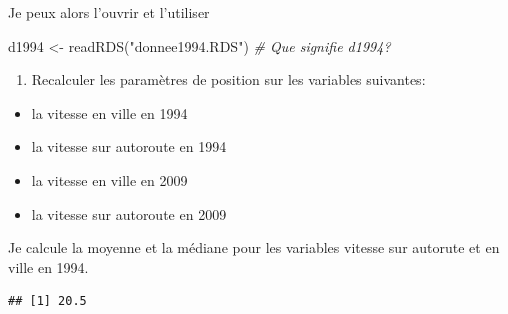 \documentclass[
]{article}
\newenvironment{Shaded}{\begin{snugshade}}{\end{snugshade}}
\newcommand{\CommentTok}[1]{\textcolor[rgb]{0.56,0.35,0.01}{\textit{#1}}}
\newcommand{\FunctionTok}[1]{\textcolor[rgb]{0.00,0.00,0.00}{#1}}
\newcommand{\NormalTok}[1]{#1}
\newcommand{\OtherTok}[1]{\textcolor[rgb]{0.56,0.35,0.01}{#1}}
\newcommand{\SpecialCharTok}[1]{\textcolor[rgb]{0.00,0.00,0.00}{#1}}
\newcommand{\StringTok}[1]{\textcolor[rgb]{0.31,0.60,0.02}{#1}}
\providecommand{\tightlist}{%
  \setlength{\itemsep}{0pt}\setlength{\parskip}{0pt}}
\begin{document}
Je peux alors l'ouvrir et l'utiliser

\begin{Shaded}
\begin{Highlighting}[]
\NormalTok{d1994 }\OtherTok{\textless{}{-}} \FunctionTok{readRDS}\NormalTok{(}\StringTok{"donnee1994.RDS"}\NormalTok{)  }\CommentTok{\# Que signifie d1994?}
\end{Highlighting}
\end{Shaded}

\begin{enumerate}
\def\labelenumi{\arabic{enumi}.}
\tightlist
\item
  Recalculer les paramètres de position sur les variables suivantes:
\end{enumerate}

\begin{itemize}
\tightlist
\item
  la vitesse en ville en 1994
\item
  la vitesse sur autoroute en 1994
\item
  la vitesse en ville en 2009
\item
  la vitesse sur autoroute en 2009
\end{itemize}

Je calcule la moyenne et la médiane pour les variables vitesse sur
autorute et en ville en 1994.

\begin{Shaded}
\end{Shaded}

\begin{verbatim}
## [1] 20.5
\end{verbatim}

\begin{Shaded}
\end{Shaded}
\end{document}
